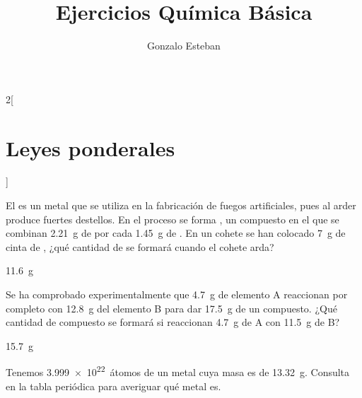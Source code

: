 \documentclass[10pt]{article}
\title{Ejercicios Química Básica}
\author{Gonzalo Esteban}
\begin{document}
\maketitle

\begin{multicols}{2}[
  \section{Leyes ponderales}
  ]

  \begin{exercise}[
      tags    = {termodinámica, entalpía, entalpia de reacción, calor},
      topics  = {química, termoquímica, termodinámica},
      source  = {FQ 1B SAN 2015, p42, e24},
    ]
    El  es un metal que se utiliza en la fabricación
    de fuegos artificiales, pues al arder produce fuertes
    destellos. En el proceso se forma , un compuesto
    en el que se combinan \SI{2.21}{\gram} de  por cada \SI{1.45}{\gram} de . En un cohete se han colocado \SI{7}{\gram} de cinta de , ¿qué cantidad de  se formará cuando el cohete arda?
  \end{exercise}

  \begin{solution}
    \SI{11.6}{\gram}
  \end{solution}




  \begin{exercise}[
      tags    = {termodinámica, entalpía, entalpia de reacción, calor},
      topics  = {química, termoquímica, termodinámica},
      source  = {FQ 1B OXF 2015, p42, e23},
    ]
    Se ha comprobado experimentalmente que \SI{4.7}{g} de elemento A reaccionan por completo con \SI{12.8}{\gram} del elemento B para dar \SI{17.5}{\gram} de un compuesto. ¿Qué cantidad de compuesto se formará si reaccionan \SI{4.7}{\gram} de A con \SI{11.5}{\gram} de B?
  \end{exercise}

  \begin{solution}
    \SI{15.7}{\gram}
  \end{solution}




  \begin{exercise}[
      tags    = {termodinámica, entalpía, entalpia de reacción, calor},
      topics  = {química, termoquímica, termodinámica},
      source  = {FQ 1B SAN 2015, p43, e34},
    ]
    Tenemos \SI{3.999e22}{átomos} de un metal cuya masa es de \SI{13.32}{\gram}. Consulta en la tabla periódica para averiguar
    qué metal es.


\end{exercise}
\end{multicols}
\end{document}
